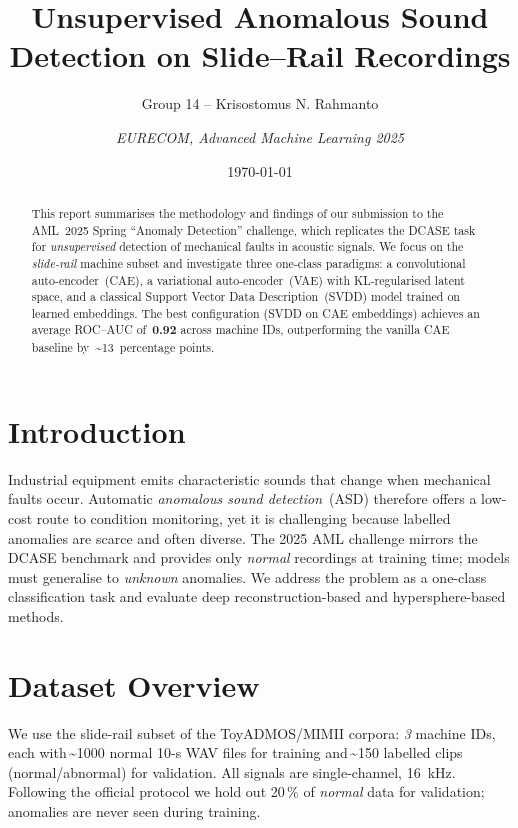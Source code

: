 \documentclass[11pt,a4paper]{article}
\title{Unsupervised Anomalous Sound Detection on Slide--Rail Recordings}
\author{Group 14 -- Krisostomus N. Rahmanto \and \textit{EURECOM, Advanced Machine Learning 2025}}
\date{\today}
\begin{document}
\maketitle

\begin{abstract}
This report summarises the methodology and findings of our submission to the AML~2025 Spring ``Anomaly Detection'' challenge, which replicates the DCASE task for \emph{unsupervised} detection of mechanical faults in acoustic signals.  We focus on the \emph{slide-rail} machine subset and investigate three one-class paradigms: a convolutional auto-encoder~(CAE), a variational auto-encoder~(VAE) with KL-regularised latent space, and a classical Support Vector Data Description~(SVDD) model trained on learned embeddings.  The best configuration (SVDD on CAE embeddings) achieves an average ROC--AUC of~\textbf{0.92} across machine IDs, outperforming the vanilla CAE baseline by~\textasciitilde13~percentage points.
\end{abstract}

\section{Introduction}
Industrial equipment emits characteristic sounds that change when mechanical faults occur.  Automatic \emph{anomalous sound detection}~(ASD) therefore offers a low-cost route to condition monitoring, yet it is challenging because labelled anomalies are scarce and often diverse.  The 2025 AML challenge mirrors the DCASE benchmark and provides only \textit{normal} recordings at training time; models must generalise to \emph{unknown} anomalies.
We address the problem as a one-class classification task and evaluate deep reconstruction-based and hypersphere-based methods.

\section{Dataset Overview}
We use the slide-rail subset of the ToyADMOS/MIMII corpora: \emph{3} machine IDs, each with\,\textasciitilde1000 normal 10-s WAV files for training and\,\textasciitilde150 labelled clips (normal/abnormal) for validation.  All signals are single-channel, 16~kHz.  Following the official protocol we hold out 20\,\% of \emph{normal} data for validation; anomalies are never seen during training.
\end{document}
